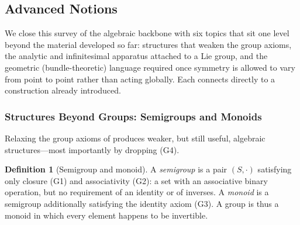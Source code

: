 \documentclass[11pt]{article}
\theoremstyle{plain}
\theoremstyle{definition}
\newtheorem{Definition}{Definition}[section]
\begin{document}

\subsection{Advanced Notions}
\label{sec:advanced-notions}

We close this survey of the algebraic backbone with six topics that sit one
level beyond the material developed so far: structures that weaken the group
axioms, the analytic and infinitesimal apparatus attached to a Lie group,
and the geometric (bundle-theoretic) language required once symmetry is
allowed to vary from point to point rather than acting globally. Each
connects directly to a construction already introduced.

\subsubsection{Structures Beyond Groups: Semigroups and Monoids}
\label{subsec:beyond-groups}

Relaxing the group axioms of  produces weaker, but
still useful, algebraic structures---most importantly by dropping (G4).

\begin{Definition}[Semigroup and monoid]
\label{def:semigroup-monoid}
A \emph{semigroup} is a pair $(S,\cdot)$ satisfying only closure (G1) and
associativity (G2): a set with an associative binary operation, but no
requirement of an identity or of inverses. A \emph{monoid} is a semigroup
additionally satisfying the identity axiom (G3). A group is thus a monoid in
which every element happens to be invertible.
\end{Definition}
\end{document}
